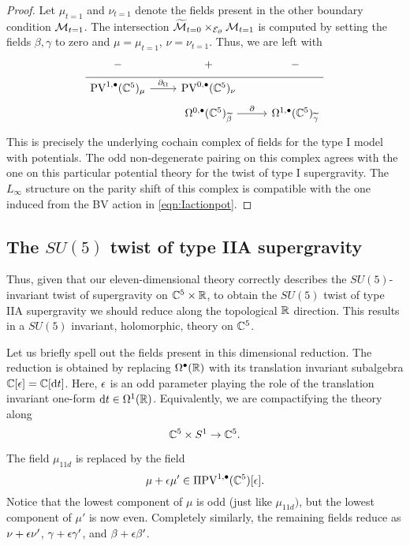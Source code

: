 \begin{proof}
Let $\mu_{t=1}$ and $\nu_{t=1}$ denote the fields present in the other boundary condition $\mathcal M_{t=1}$. 
The intersection $\widetilde {\mathcal M}_{t=0} \times_{\mathcal E_{\partial}} \mathcal M_{t=1}$ is computed by setting the fields $\beta, \gamma$ to zero and $\mu=\mu_{t=1}$, $\nu = \nu_{t=1}$. 
Thus, we are left with
\begin{equation}
  \label{eq:lin3} 
  \begin{tikzcd}[row sep = 1 ex]
    - & + & -\\ \hline
    \PV^{1,\bu}(\CC^5)_\mu \ar[r, "\div"] & \PV^{0,\bu}(\CC^5)_\nu  \\
         & \Omega^{0,\bu}(\CC^5)_{\til\beta} \ar[r, "\del"] & \Omega^{1,\bu}(\CC^5)_{\til\gamma} 
\end{tikzcd}
\end{equation}
This is precisely the underlying cochain complex of fields for the type I model with potentials. 
The odd non-degenerate pairing on this complex agrees with the one on this particular potential theory for the twist of type I supergravity. 
The $L_\infty$ structure on the parity shift of this complex is compatible with the one induced from the BV action in \eqref{eqn:Iactionpot}.
\end{proof}

\subsection{The $SU(5)$ twist of type IIA supergravity}
\label{s:su5IIA}


Thus, given that our eleven-dimensional theory correctly describes the $SU(5)$-invariant twist of supergravity on $\mathbb C^5 \times \mathbb R$, to obtain the $SU(5)$ twist of type IIA supergravity we should reduce along the topological $\mathbb R$ direction. 
This results in a $SU(5)$ invariant, holomorphic, theory on $\mathbb C^5$. 

Let us briefly spell out the fields present in this dimensional reduction. 
The reduction is obtained by replacing $\Omega^\bullet(\mathbb R)$ with its translation invariant subalgebra $\mathbb C[\epsilon] = \mathbb C[{\rm d} t]$. 
Here, $\epsilon$ is an odd parameter playing the role of the translation invariant one-form ${\rm d} t \in \Omega^1(\mathbb R)$. 
Equivalently, we are compactifying the theory along 
\[
\mathbb C^5 \times S^1 \to \mathbb C^5 .
\]

The field $\mu_{11d}$ is replaced by the field 
\[
\mu + \epsilon \mu' \in \Pi {\rm PV}^{1,\bullet}(\mathbb C^5) [\epsilon] .
\]
Notice that the lowest component of $\mu$ is odd (just like $\mu_{11d})$, but the lowest component of $\mu'$ is now even. 
Completely similarly, the remaining fields reduce as $\nu + \epsilon \nu'$, $\gamma + \epsilon \gamma'$, and $\beta + \epsilon \beta'$. 

